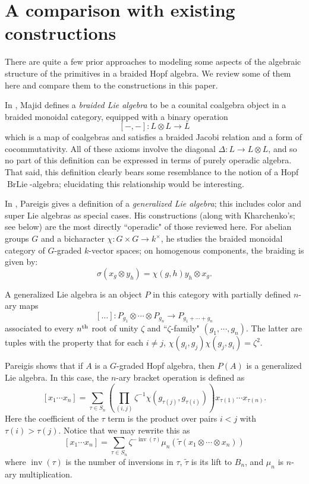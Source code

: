 \documentclass[12pt]{article}
\DeclareMathOperator{\inv}{inv}
\DeclareMathOperator{\BrLie}{BrLie}
\newcommand{\tautilde}{\widetilde{\tau}}
\newcommand{\beqn}{\begin{equation}}
\newcommand{\eeqn}{\end{equation}}
\newcommand{\nth}{\textsuperscript{th}}
\theoremstyle{plain}
\theoremstyle{definition}
\theoremstyle{remark}
\begin{document}
\section{A comparison with existing constructions} \label{ardizzoni_section} 

There are quite a few prior approaches to modeling some aspects of the algebraic structure of the primitives in a braided Hopf algebra.  We review some of them here and compare them to the constructions in this paper. 

In \cite{majid}, Majid defines a \emph{braided Lie algebra} to be a counital coalgebra object in a braided monoidal category, equipped with a binary operation
%
\beqn \label{bracket_eqn} [-,-]: L \otimes L \to L\eeqn
%
which is a map of coalgebras and satisfies a braided Jacobi relation and a form of cocommutativity.  All of these axioms involve the diagonal $\Delta: L \to L \otimes L$, and so no part of this definition can be expressed in terms of purely operadic algebra.  That said, this definition clearly bears some resemblance to the notion of a Hopf $\BrLie$-algebra; elucidating this relationship would be interesting.

In \cite{pareigis_warsaw, pareigis}, Pareigis gives a definition of a \emph{generalized Lie algebra}; this includes color and super Lie algebras as special cases.  His constructions (along with Kharchenko's; see below) are the most directly ``operadic" of those reviewed here.  For abelian groups $G$ and a bicharacter $\chi: G \times G \to k^{\times}$, he studies the braided monoidal category of $G$-graded $k$-vector spaces; on homogenous components, the braiding is given by:
%
$$\sigma(x_g \otimes y_h) = \chi(g, h) y_h \otimes x_g.$$ 

A generalized Lie algebra is an object $P$ in this category with partially defined $n$-ary maps
%
$$[\dots]: P_{g_1} \otimes \cdots \otimes P_{g_n} \to P_{g_1 + \cdots + g_n}$$
%
associated to every $n\nth$ root of unity $\zeta$ and ``$\zeta$-family" $(g_1, \cdots, g_n)$.  The latter are tuples with the property that for each $i \neq j$, $\chi(g_i, g_j) \chi(g_j, g_i) = \zeta^2$.

Pareigis shows that if $A$ is a $G$-graded Hopf algebra, then $P(A)$ is a generalized Lie algebra.  In this case, the $n$-ary bracket operation is defined as
%
$$[x_1 \cdots x_n] = \sum_{\tau \in S_n} \left(\prod_{(i,j)} \zeta^{-1} \chi(g_{\tau(j)}, g_{\tau(i)})\right) x_{\tau(1)} \cdots x_{\tau(n)}.$$
%
Here the coefficient of the $\tau$ term is the product over pairs $i<j$ with $\tau(i)>\tau(j)$.  Notice that we may rewrite this as
%
$$[x_1 \cdots x_n] = \sum_{\tau \in S_n} \zeta^{-\inv(\tau)} \mu_n(\tautilde(x_1 \otimes \cdots \otimes x_n))$$
%
where $\inv(\tau)$ is the number of inversions in $\tau$, $\tautilde$ is its lift to $B_n$, and $\mu_n$ is $n$-ary multiplication. 
\end{document}
